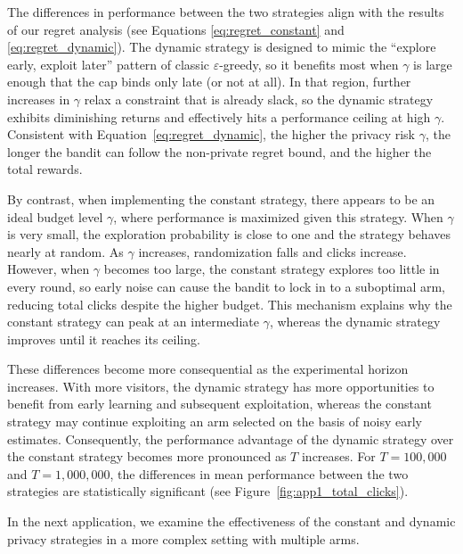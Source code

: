 \documentclass[mksc,nonblindrev]{informs3}
\begin{document}
The differences in performance between the two strategies align with the results of our regret analysis (see Equations \ref{eq:regret_constant} and \ref{eq:regret_dynamic}). The dynamic strategy is designed to mimic the ``explore early, exploit later'' pattern of classic $\varepsilon$-greedy, so it benefits most when $\gamma$ is large enough that the cap binds only late (or not at all). In that region, further increases in $\gamma$ relax a constraint that is already slack, so the dynamic strategy exhibits diminishing returns and effectively hits a performance ceiling at high $\gamma$. Consistent with Equation~\eqref{eq:regret_dynamic}, the higher the privacy risk $\gamma$, the longer the bandit can follow the non-private regret bound, and the higher the total rewards. 

By contrast, when implementing the constant strategy, there appears to be an ideal budget level $\gamma$, where performance is maximized given this strategy. When $\gamma$ is very small, the exploration probability is close to one and the strategy behaves nearly at random. As $\gamma$ increases, randomization falls and clicks increase. However, when $\gamma$ becomes too large, the constant strategy explores too little in every round, so early noise can cause the bandit to lock in to a suboptimal arm, reducing total clicks despite the higher budget. This mechanism explains why the constant strategy can peak at an intermediate $\gamma$, whereas the dynamic strategy improves until it reaches its ceiling. 

These differences become more consequential as the experimental horizon increases. With more visitors, the dynamic strategy has more opportunities to benefit from early learning and subsequent exploitation, whereas the constant strategy may continue exploiting an arm selected on the basis of noisy early estimates. Consequently, the performance advantage of the dynamic strategy over the constant strategy becomes more pronounced as $T$ increases. For $T=100{,}000$ and $T=1{,}000{,}000$, the differences in mean performance between the two strategies are statistically significant (see Figure~\ref{fig:app1_total_clicks}).

In the next application, we examine the effectiveness of the constant and dynamic privacy strategies in a more complex setting with multiple arms.
\end{document}
